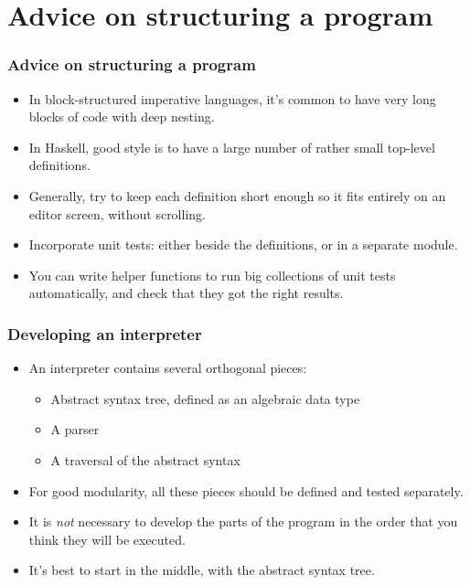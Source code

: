 \documentclass{beamer}
\begin{document}
\section{Advice on structuring a program}
\begin{frame}[fragile]
\frametitle{Advice on structuring a program}

\begin{itemize}
\item In block-structured imperative languages, it's common to have
  very long blocks of code with deep nesting.
\item In Haskell, good style is to have a large number of rather
  small top-level definitions.
\item Generally, try to keep each definition short enough so it
  fits entirely on an editor screen, without scrolling.
\item Incorporate unit tests: either beside the definitions, or in
  a separate module.
\item You can write helper functions to run big  collections of unit tests automatically, and check that they got
  the right results.
\end{itemize}

\end{frame}

\begin{frame}[fragile]
\frametitle{Developing an interpreter}

\begin{itemize}
\item An interpreter contains several orthogonal pieces:
  \begin{itemize}
  \item Abstract syntax tree, defined as an algebraic data type
  \item A parser
  \item A traversal of the abstract syntax
  \end{itemize}
\item For good modularity, all these pieces should be defined and
  tested separately.
\item It is \emph{not} necessary to develop the parts of the
  program in the order that you think they will be executed.
\item It's best to start in the middle, with the abstract syntax
  tree.
\end{itemize}

\end{frame}
\end{document}
